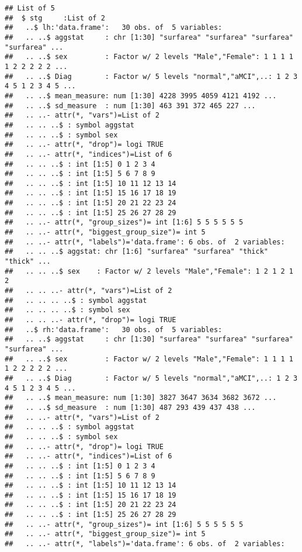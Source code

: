 \documentclass[12pt]{article}\usepackage[]{graphicx}\usepackage[]{color}
\makeatletter
\newenvironment{kframe}{%
 \def\at@end@of@kframe{}%
 \ifinner\ifhmode%
  \def\at@end@of@kframe{\end{minipage}}%
  \begin{minipage}{\columnwidth}%
 \fi\fi%
 \def\FrameCommand##1{\hskip\@totalleftmargin \hskip-\fboxsep
 \colorbox{shadecolor}{##1}\hskip-\fboxsep
     \hskip-\linewidth \hskip-\@totalleftmargin \hskip\columnwidth}%
 \MakeFramed {\advance\hsize-\width
   \@totalleftmargin\z@ \linewidth\hsize
   \@setminipage}}%
 {\par\unskip\endMakeFramed%
 \at@end@of@kframe}
\newenvironment{knitrout}{}{} %
\makeatother
\begin{document}
\begin{knitrout}
\color{fgcolor}\begin{kframe}
\begin{verbatim}
## List of 5
##  $ stg     :List of 2
##   ..$ lh:'data.frame':	30 obs. of  5 variables:
##   .. ..$ aggstat     : chr [1:30] "surfarea" "surfarea" "surfarea" "surfarea" ...
##   .. ..$ sex         : Factor w/ 2 levels "Male","Female": 1 1 1 1 1 2 2 2 2 2 ...
##   .. ..$ Diag        : Factor w/ 5 levels "normal","aMCI",..: 1 2 3 4 5 1 2 3 4 5 ...
##   .. ..$ mean_measure: num [1:30] 4228 3995 4059 4121 4192 ...
##   .. ..$ sd_measure  : num [1:30] 463 391 372 465 227 ...
##   .. ..- attr(*, "vars")=List of 2
##   .. .. ..$ : symbol aggstat
##   .. .. ..$ : symbol sex
##   .. ..- attr(*, "drop")= logi TRUE
##   .. ..- attr(*, "indices")=List of 6
##   .. .. ..$ : int [1:5] 0 1 2 3 4
##   .. .. ..$ : int [1:5] 5 6 7 8 9
##   .. .. ..$ : int [1:5] 10 11 12 13 14
##   .. .. ..$ : int [1:5] 15 16 17 18 19
##   .. .. ..$ : int [1:5] 20 21 22 23 24
##   .. .. ..$ : int [1:5] 25 26 27 28 29
##   .. ..- attr(*, "group_sizes")= int [1:6] 5 5 5 5 5 5
##   .. ..- attr(*, "biggest_group_size")= int 5
##   .. ..- attr(*, "labels")='data.frame':	6 obs. of  2 variables:
##   .. .. ..$ aggstat: chr [1:6] "surfarea" "surfarea" "thick" "thick" ...
##   .. .. ..$ sex    : Factor w/ 2 levels "Male","Female": 1 2 1 2 1 2
##   .. .. ..- attr(*, "vars")=List of 2
##   .. .. .. ..$ : symbol aggstat
##   .. .. .. ..$ : symbol sex
##   .. .. ..- attr(*, "drop")= logi TRUE
##   ..$ rh:'data.frame':	30 obs. of  5 variables:
##   .. ..$ aggstat     : chr [1:30] "surfarea" "surfarea" "surfarea" "surfarea" ...
##   .. ..$ sex         : Factor w/ 2 levels "Male","Female": 1 1 1 1 1 2 2 2 2 2 ...
##   .. ..$ Diag        : Factor w/ 5 levels "normal","aMCI",..: 1 2 3 4 5 1 2 3 4 5 ...
##   .. ..$ mean_measure: num [1:30] 3827 3647 3634 3682 3672 ...
##   .. ..$ sd_measure  : num [1:30] 487 293 439 437 438 ...
##   .. ..- attr(*, "vars")=List of 2
##   .. .. ..$ : symbol aggstat
##   .. .. ..$ : symbol sex
##   .. ..- attr(*, "drop")= logi TRUE
##   .. ..- attr(*, "indices")=List of 6
##   .. .. ..$ : int [1:5] 0 1 2 3 4
##   .. .. ..$ : int [1:5] 5 6 7 8 9
##   .. .. ..$ : int [1:5] 10 11 12 13 14
##   .. .. ..$ : int [1:5] 15 16 17 18 19
##   .. .. ..$ : int [1:5] 20 21 22 23 24
##   .. .. ..$ : int [1:5] 25 26 27 28 29
##   .. ..- attr(*, "group_sizes")= int [1:6] 5 5 5 5 5 5
##   .. ..- attr(*, "biggest_group_size")= int 5
##   .. ..- attr(*, "labels")='data.frame':	6 obs. of  2 variables:

\end{verbatim}
\end{kframe}
\end{knitrout}
\end{document}
